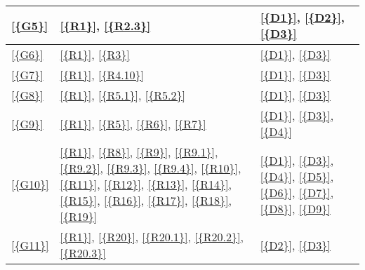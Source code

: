 \begin{table}[H]
\begin{tabular}{|l|p{8cm}|p{5cm}|}
            \ref{{G5}}       & \ref{{R1}}, \ref{{R2.3}}                                                                                                                                                                                                     & \ref{{D1}}, \ref{{D2}}, \ref{{D3}}                                                             \\\hline
            \ref{{G6}}       & \ref{{R1}}, \ref{{R3}}                                                                                                                                                                                                       & \ref{{D1}}, \ref{{D3}}                                                                         \\\hline
            \ref{{G7}}       & \ref{{R1}}, \ref{{R4.10}}                                                                                                                                                                                                    & \ref{{D1}}, \ref{{D3}}                                                                         \\\hline
            \ref{{G8}}       & \ref{{R1}}, \ref{{R5.1}}, \ref{{R5.2}}                                                                                                                                                                                       & \ref{{D1}}, \ref{{D3}}                                                                         \\\hline
            \ref{{G9}}       & \ref{{R1}}, \ref{{R5}}, \ref{{R6}}, \ref{{R7}}                                                                                                                                                                               & \ref{{D1}}, \ref{{D3}}, \ref{{D4}}                                                             \\\hline
            \ref{{G10}}      & \ref{{R1}}, \ref{{R8}}, \ref{{R9}}, \ref{{R9.1}}, \ref{{R9.2}}, \ref{{R9.3}}, \ref{{R9.4}}, \ref{{R10}}, \ref{{R11}}, \ref{{R12}}, \ref{{R13}}, \ref{{R14}}, \ref{{R15}}, \ref{{R16}}, \ref{{R17}}, \ref{{R18}}, \ref{{R19}} & \ref{{D1}}, \ref{{D3}}, \ref{{D4}}, \ref{{D5}}, \ref{{D6}}, \ref{{D7}}, \ref{{D8}}, \ref{{D9}} \\\hline
            \ref{{G11}}      & \ref{{R1}}, \ref{{R20}}, \ref{{R20.1}}, \ref{{R20.2}}, \ref{{R20.3}}                                                                                                                                                         & \ref{{D2}}, \ref{{D3}}                                                                         \\\hline

\end{tabular}
\end{table}
